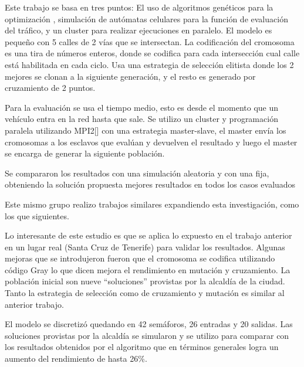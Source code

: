 \begin{itemize}
	\begin{item}
		
		Este trabajo se basa en tres puntos: El uso de algoritmos genéticos para la optimización , simulación de autómatas celulares para la función de evaluación del tráfico, y un cluster para realizar ejecuciones en paralelo.
		El modelo es pequeño con 5 calles de 2 vías que se intersectan.
		La codificación del cromosoma es una tira de números enteros, donde se codifica para cada intersección cual calle está habilitada en cada ciclo.
		Usa una estrategia de selección elitista donde los 2 mejores se clonan a la siguiente generación, y el resto es generado por cruzamiento de 2 puntos.
		
		Para la evaluación se usa el tiempo medio, esto es desde el momento que un vehículo entra en la red hasta que sale. Se utilizo un cluster y programación paralela utilizando MPI2[] con una estrategia master-slave, el master envía los cromosomas a los esclavos que evalúan y devuelven el resultado y luego el master se encarga de generar la siguiente población.
		
		Se compararon los resultados con una simulación aleatoria y con una fija, obteniendo la solución propuesta mejores resultados en todos los casos evaluados
		
		Este mismo grupo realizo trabajos similares expandiendo esta investigación, como los que siguientes.
	\end{item}

	\begin{item}
		\bibentry{Sanchez2008}
Lo interesante de este estudio es que se aplica lo expuesto en el trabajo anterior en un lugar real (Santa Cruz de Tenerife) para validar los resultados.
Algunas mejoras que se introdujeron fueron que el cromosoma se codifica utilizando código Gray lo que dicen mejora el rendimiento en mutación y cruzamiento. La población inicial son nueve “soluciones” provistas por la alcaldía de la ciudad. Tanto la estrategia de selección como de cruzamiento y mutación  es similar al anterior trabajo.

El modelo se discretizó quedando en 42 semáforos, 26 entradas y 20 salidas.
Las soluciones provistas por la alcaldía se simularon y se utilizo para comparar con los resultados obtenidos por el algoritmo que en términos generales logra un aumento del rendimiento de hasta 26\%.

	\end{item}


\end{itemize}
